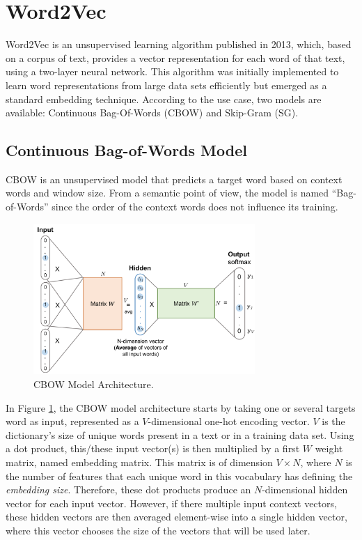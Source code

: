 
\section{Word2Vec}
\label{sec:w2v}

Word2Vec is an unsupervised learning algorithm published in 2013, which, based
on a corpus of text, provides a vector representation for each word of that
text, using a two-layer neural network. This algorithm was initially implemented
to learn word representations from large data sets efficiently but emerged as a
standard embedding technique. According to the use case, two models are
available: Continuous Bag-Of-Words (CBOW) and Skip-Gram (SG).

\subsection{Continuous Bag-of-Words Model}
\label{subsec:w2v:cbow}

CBOW is an unsupervised model that predicts a target word based on context words
and window size. From a semantic point of view, the model is named
``Bag-of-Words'' since the order of the context words does not influence its
training.
\begin{figure}[!ht]
  \centering
  \includegraphics[width=0.75\textwidth]{img/embedders/w2v/cbow}
  \caption{CBOW Model Architecture.}
  \label{fig:w2v:cbow:architecture}
\end{figure}

In Figure \ref{fig:w2v:cbow:architecture}, the CBOW model architecture starts by
taking one or several targets word as input, represented as a $V$-dimensional
one-hot encoding vector. $V$ is the dictionary's size of unique words present in
a text or in a training data set. Using a dot product, this/these input
vector(s) is then multiplied by a first $W$ weight matrix, named embedding
matrix. This matrix is of dimension $V \times N$, where $N$ is the number of
features that each unique word in this vocabulary has defining the
\emph{embedding size}. Therefore, these dot products produce an $N$-dimensional
hidden vector for each input vector. However, if there multiple input context
vectors, these hidden vectors are then averaged element-wise into a single
hidden vector, where this vector chooses the size of the vectors that will be
used later.


